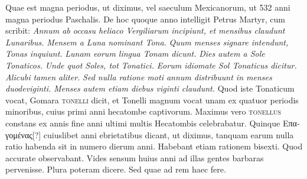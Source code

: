 Quae
est magna periodus, ut diximus, vel saeculum Mexicanorum, ut 532
anni magna periodus Paschalis.
De hoc quoque anno intelligit Petrus
Martyr, cum scribit: \textit{Annum ab occasu heliaco Vergiliarum incipiunt,
et mensibus claudunt Lunaribus.}
\textit{Mensem a Luna nominant
Tona.}
\textit{Quum menses signare intendunt, Tonas inquiunt.}
\textit{Lunam
eorum lingua Tonam dicunt.}
\textit{Dies autem a Sole Tonaticos.}
\textit{Unde quot Soles, tot Tonatici.}
\textit{Eorum idiomate Sol Tonaticus dicitur.}
\textit{Alicubi tamen aliter.}
\textit{Sed nulla ratione moti annum distribuunt
in menses duodeviginti.}
\textit{Menses autem etiam diebus viginti claudunt.}
Quod iste Tonaticum vocat, Gomara \textsc{tonelli} dicit, et Tonelli
magnum vocat unam ex quatuor periodis minoribus, cuius primi
anni hecatombe captivorum.
Maximus vero \textsc{tonellus} constans
ex  annis fine anni ultimi multis Hecatombis celebrabatur.
Quinque \textgreek{Επαγομένας}[?]
 cuiuslibet anni ebrietatibus dicant, ut diximus,
tanquam earum nulla ratio habenda sit in numero dierum anni.
Habebant etiam rationem bisexti.
Quod accurate observabant.
Vides sensum huius anni ad illas gentes barbaras pervenisse.
Plura
poteram dicere.
Sed quae ad rem haec fere.
%
%


























